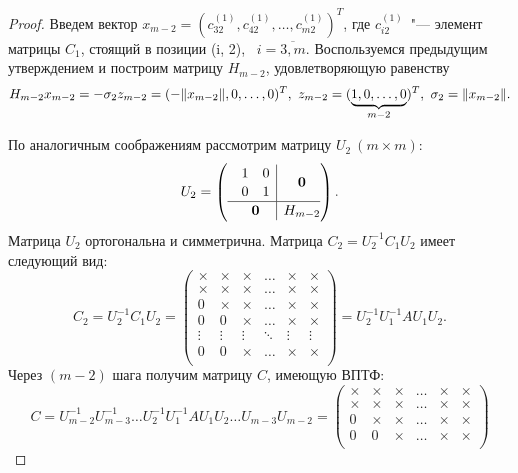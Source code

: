\documentclass[11pt,a4paper,twoside,listtotoc,bibtotoc]{report}
\numberwithin{equation}{section}
\theoremstyle{definition}
\theoremstyle{plain}
\DeclarePairedDelimiter\norm{\lVert}{\rVert}
\begin{document}
\begin{proof}
Введем вектор $x_{m-2}=(c_{32}^{(1)}, c_{42}^{(1)},\ldots,c_{m2}^{(1)})^T$,
где $c_{i2}^{(1)}$~"--- элемент матрицы $C_1$, стоящий в позиции (i, 2),
~$i = \overline{3, m}$.
Воспользуемся предыдущим утверждением и построим матрицу $H_{m-2}$,
удовлетворяющую равенству
%
$$
    H_{m-2}x_{m-2}=-\sigma_2z_{m-2}=(-\norm{x_{m-2}},0,\ldots,0)^T,
    ~z_{m-2}=(\underbrace{1,0,\ldots,0}_{m-2})^T, ~\sigma_2 = \norm{x_{m-2}}.
$$
%

По аналогичным соображениям рассмотрим матрицу $U_2~(m \times m)$:
%
$$
\renewcommand\arraystretch{1.1}
    U_2=\left(
    \begin{array}{c@{}|c@{}}
        \begin{array}{cc}
            1 & 0 \\
            0 & 1 \\
        \end{array}
        & \mathbf{0} \\ \hline
        \mathbf{0} & H_{m-2}\\
    \end{array}
    \right).
$$
%
Матрица $U_2$ ортогональна и симметрична. Матрица $C_2=U_2^{-1}C_1U_2$
имеет следующий вид:
%
$$
    C_2=U_2^{-1}C_1U_2=
    \begin{pmatrix}
        \times & \times & \times  & \ldots & \times & \times\\
        \times & \times & \times  & \ldots & \times & \times\\
        0      & \times & \times  & \ldots & \times & \times\\
        0      & 0      & \times  & \ldots & \times & \times\\
        \vdots & \vdots & \vdots  & \ddots & \vdots & \vdots\\
        0      & 0      & \times  & \ldots & \times & \times\\
    \end{pmatrix}
    =U_2^{-1}U^{-1}_1AU_1U_2.
$$
%
Через $(m-2)$ шага получим матрицу $C$, имеющую {\scshape ВПТФ}:
%
$$
    C=U^{-1}_{m-2}U^{-1}_{m-3}\ldots
    U^{-1}_2U^{-1}_1AU_1U_2\ldots U_{m-3} U_{m-2}=
    \begin{pmatrix}
        \times & \times & \times & \ldots & \times & \times\\
        \times & \times & \times & \ldots & \times & \times\\
        0      & \times & \times & \ldots & \times & \times\\
        0      &      0 & \times & \ldots & \times & \times\\

\end{pmatrix}$$
\end{proof}
\end{document}

